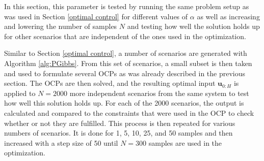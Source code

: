 In this section, this parameter is tested by running the same problem setup as was used in Section \ref{optimal control} for different values of $\alpha$ as well as increasing and lowering the number of samples $N$ and testing how well the solution holds up for other scenarios that are independent of the ones used in the optimization.

Similar to Section \ref{optimal control}, a number of scenarios are generated with Algorithm \ref{alg:PGibbs}. From this set of scenarios, a small subset is then taken and used to formulate several OCPs as was already described in the previous section. The OCPs are then solved, and the resulting optimal input $\boldsymbol{u}_{0:H}$ is applied to $N = 2000$ more independent scenarios from the same system to test how well this solution holds up. For each of the 2000 scenarios, the output is calculated and compared to the constraints that were used in the OCP to check whether or not they are fulfilled. This process is then repeated for various numbers of scenarios. It is done for 1, 5, 10, 25, and 50 samples and then increased with a step size of 50 until $N = 300$ samples are used in the optimization.

